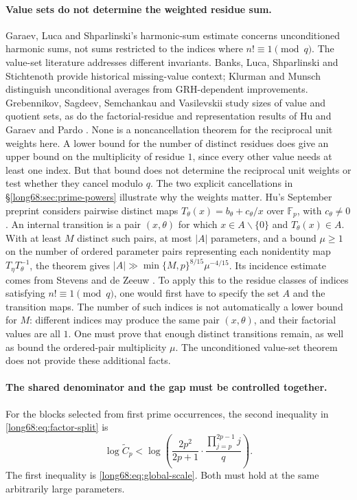 \paragraph{Value sets do not determine the weighted residue sum.}
Garaev, Luca and Shparlinski's harmonic-sum estimate
\cite[Theorem~1 and (5)]{garaev-luca-shparlinski-harmonic} concerns
unconditioned harmonic sums, not sums restricted to the indices where
$n!\equiv1\pmod q$.
The value-set literature addresses different invariants.  Banks, Luca,
Shparlinski and Stichtenoth \cite{banks-et-al2005} provide historical
missing-value context; Klurman and Munsch
\cite[Theorems~2.1--2.2]{klurman-munsch2017} distinguish unconditional
averages from GRH-dependent improvements.  Grebennikov, Sagdeev,
Semchankau and Vasilevskii
\cite[Corollaries~1.2 and~1.4]{grebennikov-et-al2024} study sizes of value
and quotient sets, as do the factorial-residue and representation results
of Hu \cite{hu2026} and Garaev and Pardo \cite{garaev-pardo2026}.
None is a noncancellation theorem for the reciprocal unit weights here.
A lower bound for the number of distinct residues does give an upper
bound on the multiplicity of residue $1$, since every other value needs
at least one index. But that bound does not determine the reciprocal
unit weights or test whether they cancel modulo
$q$. The two explicit cancellations in \S\ref{long68:sec:prime-powers} illustrate
why the weights matter.
Hu's September preprint \cite[Theorem~3.1]{hu-september2026} considers
pairwise distinct maps $T_\theta(x)=b_\theta+c_\theta/x$ over $\mathbb F_p$,
with $c_\theta\ne0$. An internal transition is a pair $(x,\theta)$ for which
$x\in A\smallsetminus\{0\}$ and $T_\theta(x)\in A$.
With at least $M$ distinct such pairs, at most $|A|$ parameters, and a
bound $\mu\ge1$ on the number of ordered parameter pairs representing each
nonidentity map $T_\eta T_\theta^{-1}$, the theorem gives $|A|\gg\min\{M,p\}^{8/15}\mu^{-4/15}$. Its incidence estimate comes
from Stevens and de Zeeuw \cite[Theorem~4]{stevens-dezeeuw2017}.
To apply this to the residue classes of indices satisfying
$n!\equiv1\pmod q$, one would first have to specify the set $A$ and the
transition maps. The number of such indices is not automatically a
lower bound for $M$: different indices may produce the same pair
$(x,\theta)$, and their factorial values are all $1$. One must prove that
enough distinct transitions remain, as well as bound the ordered-pair
multiplicity $\mu$. The unconditioned value-set theorem does not provide
these additional facts.

\paragraph{The shared denominator and the gap must be controlled together.}
For the blocks selected from first prime occurrences, the second inequality
in \eqref{long68:eq:factor-split} is
\begin{equation}\label{long68:eq:weighted-target}
 \log\widetilde C_p
 <\log\left(\frac{2p^2}{2p+1}\cdot
       \frac{\prod_{j=p}^{2p-1}j}{q}\right).
\end{equation}
The first inequality is \eqref{long68:eq:global-scale}. Both must hold at
the same arbitrarily large parameters.

